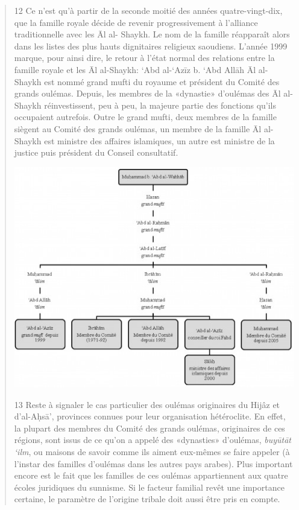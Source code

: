 \begin{quote}
12 Ce n'est qu'à partir de la seconde moitié des années
quatre-vingt-dix, que la famille royale décide de revenir
progressivement à l'alliance traditionnelle avec les Āl al- Shaykh. Le
nom de la famille réapparaît alors dans les listes des plus hauts
dignitaires religieux saoudiens. L'année 1999 marque, pour ainsi dire,
le retour à l'état normal des relations entre la famille royale et les
Āl al-Shaykh: `Abd al-`Azīz b. `Abd Allāh Āl al- Shaykh est nommé grand
mufti du royaume et président du Comité des grands oulémas. Depuis, les
membres de la «dynastie» d'oulémas des Āl al-Shaykh réinvestissent, peu
à peu, la majeure partie des fonctions qu'ils occupaient autrefois.
Outre le grand mufti, deux membres de la famille siègent au Comité des
grands oulémas, un membre de la famille Āl al-Shaykh est ministre des
affaires islamiques, un autre est ministre de la justice puis président
du Conseil consultatif.

\includegraphics[width=\textwidth]{CourantsIslamContemporain/ImagesCourantsIslamContemporain/genealogie.jpeg}

13 Reste à signaler le cas particulier des oulémas originaires du Hijâz
et d'al-Aḥsā', provinces connues pour leur organisation hétéroclite. En
effet, la plupart des membres du Comité des grands oulémas, originaires
de ces régions, sont issus de ce qu'on a appelé des «dynasties»
d'oulémas, \emph{buyūtāt `ilm}, ou maisons de savoir comme ils aiment
eux-mêmes se faire appeler (à l'instar des familles d'oulémas dans les
autres pays arabes). Plus important encore est le fait que les familles
de ces oulémas appartiennent aux quatre écoles juridiques du sunnisme.
Si le facteur familial revêt une importance certaine, le paramètre de
l'origine tribale doit aussi être pris en compte.
\end{quote}

